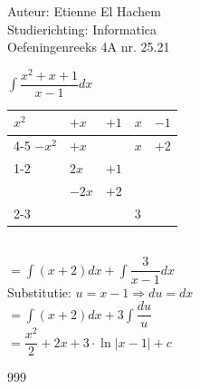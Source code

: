 \documentclass[a4paper]{article}
\begin{document}
  
\noindent \large Auteur: Etienne El Hachem \\
\noindent \large Studierichting: Informatica\\
\noindent \large Oefeningenreeks 4A nr. 25.21\\

\medskip

\normalsize

$\displaystyle\int \dfrac{x^2 + x + 1}{x - 1} dx$ \\

\begin{tabular}{lll|ll}
$x^2$ & $+x$ & $+1$ & $x$ & $-1$ \\ \cline{4-5}
$-x^2$ & $+x$ & & $x$ & $+2$ \\ \cline{1-2}
& $2x$ & $+1$ & & \\
& $-2x$ & $+2$ & & \\ \cline{2-3}
& & & $3$ & \\
\end{tabular} \\




$= \displaystyle\int (x+2)dx + \displaystyle\int \dfrac{3}{x-1} dx$ \\

Substitutie: $u = x - 1 \Rightarrow du = dx$ \\

$= \displaystyle\int (x + 2) dx + 3 \displaystyle\int \dfrac{du}{u}$ \\

$= \dfrac{x^2}{2} + 2x + 3 \cdot \ln |x-1| + c$

\begin{thebibliography}{999}
\end{thebibliography}
\end{document}
